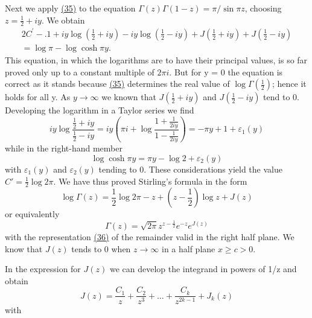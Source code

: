 Next we apply \hyperref[eq:5.35]{(35)} to the equation $\Gamma(z)\Gamma(1 - z) = \pi/\sin\pi z$, choosing $z = \frac{1}{2} + iy$. We obtain
\begin{equation*}
\begin{array}{r} 2 C ^ {\prime} -. 1 + i y \log (\frac {1}{2} + i y) - i y \log (\frac {1}{2} - i y) + J (\frac {1}{2} + i y) + J (\frac {1}{2} - i y) \\ = \log \pi - \log \cosh \pi y. \end{array}
\end{equation*}
This equation, in which the logarithms are to have their principal values, is so far proved only up to a constant multiple of $2\pi i$. But for y = 0 the equation is correct as it stands because \hyperref[eq:5.35]{(35)} determines the real value of $\log \Gamma(\frac{1}{2})$; hence it holds for all y. As $y \to \infty$ we known that $J(\frac{1}{2} + iy)$ and $J(\frac{1}{2} - iy)$ tend to 0. Developing the logarithm in a Taylor series we find
\begin{equation*}
i y \log \frac {\frac {1}{2} + i y}{\frac {1}{2} - i y} = i y \left(\pi i + \log \frac {1 + \frac {1}{2 i y}}{1 - \frac {1}{2 i y}}\right) = - \pi y + 1 + \varepsilon_ {1} (y)
\end{equation*}
while in the right-hand member
\begin{equation*}
\log \cosh \pi y = \pi y - \log 2 + \varepsilon_ {2} (y)
\end{equation*}
with $\varepsilon_1(y)$ and $\varepsilon_2(y)$ tending to 0. These considerations yield the value $C' = \frac{1}{2} \log 2\pi$. We have thus proved Stirling's formula in the form
\begin{equation*}
\log \Gamma (z) = \frac {1}{2} \log 2 \pi - z + (z - \frac {1}{2}) \log z + J (z)\tag{37}\label{eq:5.37}
\end{equation*}
or equivalently
\begin{equation*}
\Gamma (z) = \sqrt {2 \pi} z ^ {z - \frac {1}{2}} e ^ {- z} e ^ {J (z)}\tag{38}\label{eq:5.38}
\end{equation*}
with the representation \hyperref[eq:5.36]{(36)} of the remainder valid in the right half plane. We know that $J(z)$ tends to 0 when $z \to \infty$ in a half plane $x \geq c > 0$.

In the expression for $J(z)$ we can develop the integrand in powers of 1/z and obtain
\begin{equation*}
J (z) = \frac {C _ {1}}{z} + \frac {C _ {2}}{z ^ {3}} + \dots + \frac {C _ {k}}{z ^ {2 k - 1}} + J _ {k} (z)
\end{equation*}
with


